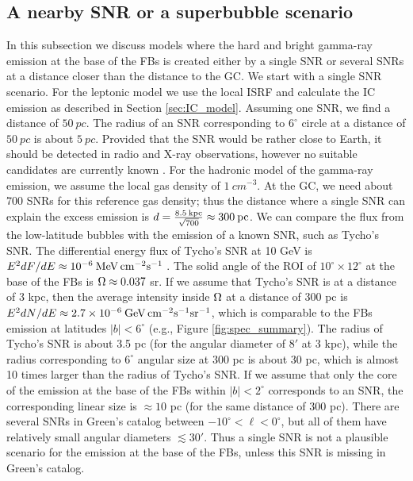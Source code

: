 \subsection{A nearby SNR or a superbubble scenario}

In this subsection we discuss models where the hard and bright gamma-ray emission at the base of the FBs is created either by a single SNR
or several SNRs at a distance closer than the distance to the GC.
We start with a single SNR scenario.
For the leptonic model we use the local ISRF and calculate the IC emission as described in Section \ref{sec:IC_model}.
Assuming one SNR, we find a distance of $\SI{50}{pc}$.
The radius of an SNR corresponding to $6^\circ$ circle at a distance of $\SI{50}{pc}$ is about $\SI{5}{pc}$.
Provided that the SNR would be rather close to Earth, it should be detected in radio and X-ray observations,
however no suitable candidates are currently known \citep{2014BASI...42...47G, 2017Green}.
For the hadronic model of the gamma-ray emission, we assume the local gas density of $\SI{1}{cm^{-3}}$.
At the GC, we need about 700 SNRs for this reference gas density; 
thus the distance where a single SNR can explain the excess emission is $d = \frac{8.5\: {\rm kpc}}{\sqrt{700}} \approx 300\:{\rm pc}$.
We can compare the flux from the low-latitude bubbles with the emission of a known SNR, such as Tycho's SNR.
The differential energy flux of Tycho's SNR at 10 GeV is $E^2 {dF}/{dE} \approx 10^{-6}\: {\rm MeV\, cm^{-2} s^{-1}}$ \citep{2017ApJ...836...23A}.
The solid angle of the ROI of $10^\circ \times 12^\circ$ at the base of the FBs is $\Omega \approx 0.037$ sr.
If we assume that Tycho's SNR is at a distance of 3 kpc, then the average intensity inside $\Omega$ at a distance of 300 pc
is $E^2 {dN}/{dE} \approx 2.7 \times 10^{-6}\: {\rm GeV\, cm^{-2} s^{-1} sr^{-1}}$, which is comparable to the 
FBs emission at latitudes $|b| < 6^\circ$ (e.g., Figure \ref{fig:spec_summary}).
The radius of Tycho's SNR is about 3.5 pc (for the angular diameter of $8'$ at 3 kpc),
while the radius corresponding to $6^\circ$ angular size at 300 pc is about 30 pc, which is almost 10 times larger than the radius of Tycho's SNR.
If we assume that only the core of the emission at the base of the FBs within $|b| < 2^\circ$ corresponds to an SNR,
the corresponding linear size is $\approx 10$ pc (for the same distance of 300 pc).
There are several SNRs in Green's catalog \citep{2014BASI...42...47G, 2017Green} between $-10^\circ < \ell < 0^\circ$,
but all of them have relatively small angular diameters $ \lesssim 30'$.
Thus a single SNR is not a plausible scenario for the emission at the base of the FBs,
unless this SNR is missing in Green's catalog.

